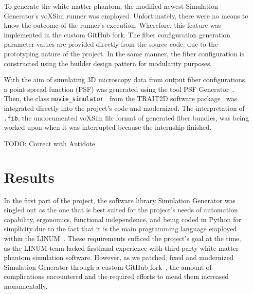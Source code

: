 \documentclass{article}
\begin{document}
  To generate the white matter phantom, the modified newest Simulation Generator's voXSim runner was employed.
  Unfortunately, there were no means to know the outcome of the runner's execution.
  Wherefore, this feature was implemented in the custom GitHub fork.
  The fiber configuration generation parameter values are provided directly from the source code, due to the prototyping nature of the project.
  In the same manner, the fiber configuration is constructed using the builder design pattern for modularity purposes.

  With the aim of simulating 3D microscopy data from output fiber configurations, a point spread function (PSF) was generated using the tool PSF Generator~\cite{kirshnersage2017psfgenerator}.
  Then, the class \lstinline!movie_simulator!~\cite{lefebvre2021trait2dmoviesim} from the TRAIT2D software package~\cite{reina2021trait2d} was integrated directly into the project's code and modernized.
  The interpretation of \lstinline!.fib!, the undocumented voXSim file format of generated fiber bundles, was being worked upon when it was interrupted because the internship finished.

  TODO: Correct with Antidote


  \section{Results}\label{sec:results}

  In the first part of the project, the software library Simulation Generator was singled out as the one that is best suited for the project's needs of automation capability, ergonomics, functional independence, and being coded in Python for simplicity due to the fact that it is the main programming language employed within the LINUM~\cite{dubreuil2022inf6200}.
  These requirements sufficed the project's goal at the time, as the LINUM team lacked firsthand experience with third-party white matter phantom simulation software.
  However, as we patched, fixed and modernized Simulation Generator through a custom GitHub fork~\cite{dubreuil2022inm5803simgenfork, valcourtcaron2022simulationgenerator}, the amount of complications encountered and the required efforts to mend them increased monumentally.
\end{document}
